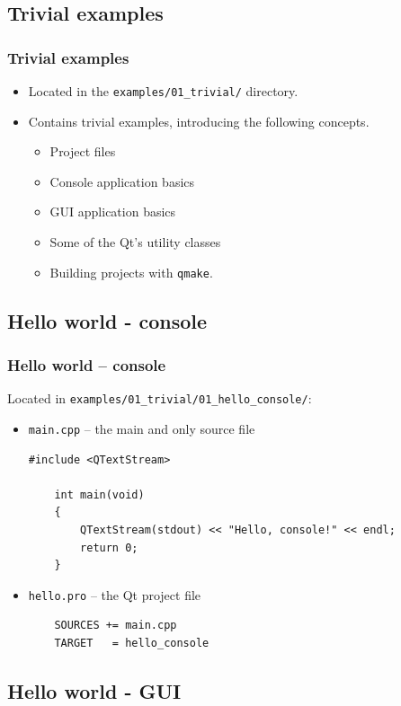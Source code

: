 \subsection{Trivial examples}

\begin{frame}
  \frametitle{Trivial examples}
  \begin{itemize}
  \item Located in the \texttt{examples/01\_trivial/} directory.
  \item Contains trivial examples, introducing the following concepts.
    \begin{itemize}
    \item Project files
    \item Console application basics
    \item GUI application basics
    \item Some of the Qt's utility classes
    \item Building projects with \texttt{qmake}.
    \end{itemize}
  \end{itemize}
\end{frame}

\subsection{Hello world - console}

\begin{frame}[fragile]
  \frametitle{Hello world -- console}
  Located in \texttt{examples/01\_trivial/01\_hello\_console/}:
  \begin{itemize}
  \item \texttt{main.cpp} -- the main and only source file
  \begin{lstlisting}[basicstyle=\scriptsize\ttfamily]
	#include <QTextStream>
 	 
	int main(void)
	{
	    QTextStream(stdout) << "Hello, console!" << endl;
	    return 0;
	}
  \end{lstlisting}
  \item \texttt{hello.pro} -- the Qt project file
  \begin{lstlisting}
	SOURCES += main.cpp
	TARGET   = hello_console
  \end{lstlisting}
  \end{itemize}
\end{frame}

\subsection{Hello world - GUI}

